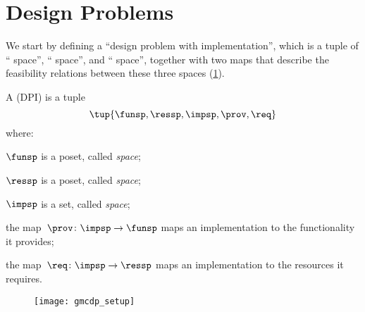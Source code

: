 

\section{Design Problems}
\label{sec:Design-Problems}

We start by defining a ``design problem with implementation'', which is a tuple of `` space'', `` space'', and `` space'', together with two maps that describe the feasibility relations between these three spaces (\cref{fig:setup}).

\begin{definition}
    \label{def:DPI}
    A \emph{} (DPI) is a tuple
    \begin{equation}
        \tup{\funsp, \ressp, \impsp, \prov,\req}
    \end{equation}
    where:

    \begin{compactitem}
        \item $\funsp$ is a poset, called \emph{ space};
        \item $\ressp$ is a poset, called \emph{ space};
        \item $\impsp$ is a set, called \emph{ space};
        \item the map~$\prov\colon\impsp\rightarrow\funsp$
        maps an implementation to the functionality it provides;
        \item the map~$\req\colon\impsp\rightarrow\ressp$
        maps an implementation to the resources it requires.
    \end{compactitem}

    \begin{figure}[h]
        \begin{center}
            \texttt{[image: gmcdp\_setup]}
        \end{center}
        \caption{\label{fig:setup}}
    \end{figure}
\end{definition}

